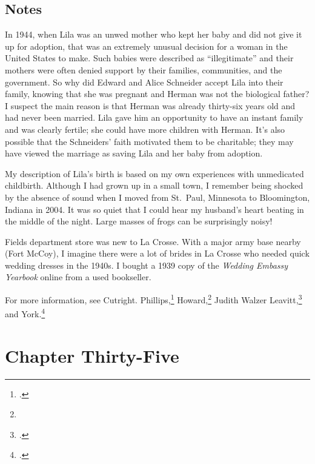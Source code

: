 \documentclass[
  american,
  letterpaper,
]{book}
\begin{document}
\section{Notes}\label{notes-36}

In 1944, when Lila was an unwed mother who kept her baby and did not
give it up for adoption, that was an extremely unusual decision for a
woman in the United States to make. Such babies were described as
``illegitimate'' and their mothers were often denied support by their
families, communities, and the government. So why did Edward and Alice
Schneider accept Lila into their family, knowing that she was pregnant
and Herman was not the biological father? I suspect the main reason is
that Herman was already thirty-six years old and had never been married.
Lila gave him an opportunity to have an instant family and was clearly
fertile; she could have more children with Herman. It's also possible
that the Schneiders' faith motivated them to be charitable; they may
have viewed the marriage as saving Lila and her baby from adoption.

My description of Lila's birth is based on my own experiences with
unmedicated childbirth. Although I had grown up in a small town, I
remember being shocked by the absence of sound when I moved from
St.~Paul, Minnesota to Bloomington, Indiana in 2004. It was so quiet
that I could hear my husband's heart beating in the middle of the night.
Large masses of frogs can be surprisingly noisy!

Fields department store was new to La Crosse. With a major army base
nearby (Fort McCoy), I imagine there were a lot of brides in La Crosse
who needed quick wedding dresses in the 1940s. I bought a 1939 copy of
the \emph{Wedding Embassy Yearbook} online from a used bookseller.

For more information, see Cutright. Phillips,\footnote{.} Howard,\footnote{} Judith Walzer Leavitt,\footnote{.} and York.\footnote{.}


\chapter{Chapter Thirty-Five}\label{chapter-thirty-five}
\end{document}
